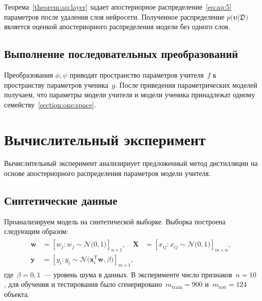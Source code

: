\documentclass[12pt]{a&t}
\begin{document}
Теорема~\ref{theorem:ap:layer} задает апостериорное распределение~\eqref{eq:ap:5} параметров после удаления слоя нейросети. Полученное распределение $p\bigr(\bm{\upsilon}|\mathfrak{D}\bigr) $ является оценкой апостериорного распределения модели без одного слоя.

\subsection{Выполнение последовательных преобразований}
Преобразования $\phi, \psi$ приводят пространство параметров учителя~$f$ к пространству параметров ученика~$g$. После приведения параметрических моделей получаем, что параметры модели учителя и модели ученика принадлежат одному семейству~\ref{section:one:space}.

\section{Вычислительный эксперимент}
Вычислительный эксперимент анализириует предложенный метод дистилляции на основе апостериорного распределения параметров модели учителя.

\subsection{Синтетические данные}
Проанализируем модель на синтетической выборке. Выборка построена следующим образом:
\begin{gather}
\label{eq:ex:1}
\begin{aligned}
\mathbf{w} &= \left[w_j: w_{j}\sim \mathcal{N}\bigr(0, 1\bigr)\right]_{n\times 1}, \quad \mathbf{X} &= \left[x_{ij}: x_{ij}\sim\mathcal{N}\bigr(0, 1\bigr)\right]_{m\times n}, \\
 \mathbf{y} &= \left[y_i: y_i \sim \mathcal{N}\bigr(\mathbf{x}_i^{\mathsf{T}}\mathbf{w}, \beta\bigr)\right]_{m \times 1},
\end{aligned}
\end{gather} 
где~$\beta=0{,}1$~--- уровень шума в данных. В эксперименте число признаков~$n=10$, для обучения и тестирования было сгенерировано~$m_{\text{train}}=900$ и~$m_{\text{test}}=124$ объекта.
\end{document}
